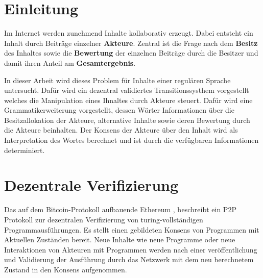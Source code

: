 \documentclass[]{article}
\author{}
\date{}
\begin{document}
\tableofcontents


\newpage

\section{Einleitung}

Im Internet werden zunehmend Inhalte kollaborativ erzeugt. 
Dabei entsteht ein Inhalt durch Beiträge einzelner \textbf{Akteure}.
Zentral ist die Frage nach dem \textbf{Besitz} des Inhaltes sowie die \textbf{Bewertung} der einzelnen Beiträge durch die Besitzer und damit ihren Anteil am \textbf{Gesamtergebnis}. 


In dieser Arbeit wird dieses Problem für Inhalte einer regulären Sprache untersucht. Dafür wird ein dezentral validiertes Transitionssysthem vorgestellt welches die Manipulation eines Ihnaltes durch Akteure steuert. Dafür wird eine Grammatikerweiterung vorgestellt, dessen Wörter Informationen über die Besitzallokation der Akteure, alternative Inhalte sowie deren Bewertung durch die Akteure beinhalten. Der Konsens der Akteure über den Inhalt wird als Interpretation des Wortes berechnet und ist durch die verfügbaren Informationen determiniert. 

\newpage





\section{Dezentrale Verifizierung}

Das auf dem Bitcoin-Protokoll\cite{Nakamoto2008} aufbauende Ethereum \cite{Wood2014}, beschreibt ein P2P Protokoll zur dezentralen Verifizierung von turing-vollständigen Programmausführungen. 
Es stellt einen gebildeten Konsens von Programmen mit Aktuellen Zuständen bereit. 
Neue Inhalte wie neue Programme oder neue Interaktionen von Akteuren mit Programmen werden nach einer veröffentlichung und Validierung der Ausführung durch das Netzwerk mit dem neu berechnetem Zustand in den Konsens aufgenommen.
\end{document}
